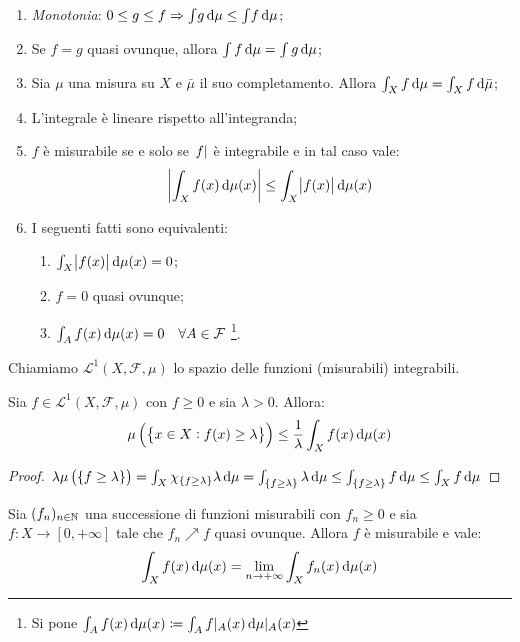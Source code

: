 \begin{enumerate}
    \item \emph{Monotonia}: $ 0 \leq g \leq f \Rightarrow \int\! g\dif\mu \leq \int\! f\dif\mu $;
    \item \label{it:quasi_ovunque}Se $ f=g $ quasi ovunque, allora $ \int f\dif\mu = \int g\dif\mu $;
    \item Sia $ \mu $ una misura su $ X $ e $ \bar{\mu} $ il suo completamento. Allora $ \int_X f\dif\mu = \int_X f\dif\bar{\mu} $;
    \item L'integrale è lineare rispetto all'integranda;
    \item $ f $ è misurabile se e solo se $ \abs{f} $ è integrabile e in tal caso vale:
    \[ \abs{ \int_X f(x)\dif\mu(x)} \leq \int_X \abs{f(x)}\dif\mu(x) \]
    \item I seguenti fatti sono equivalenti:
    \begin{enumerate}[label=(\roman*)]
        \item $ \int_X \abs{f(x)}\dif\mu(x) = 0$;
        \item $ f = 0 $ quasi ovunque;
        \item $ \int_A f(x)\dif\mu(x) = 0 \quad \forall A\in\mathcal{F} $ \footnote{Si pone $ \int_A f(x)\dif\mu(x) \coloneqq \int_A f\rvert_A(x) \dif\mu\rvert_A(x) $}.
    \end{enumerate}
\end{enumerate}
\begin{definition}
    Chiamiamo $ \mathscr{L}^1(X,\mathcal{F},\mu) $ lo spazio delle funzioni (misurabili) integrabili.
\end{definition}
\begin{exercise}
    Sia $ f\in\mathscr{L}^1(X,\mathcal{F},\mu) $ con $ f\geq 0 $ e sia $ \lambda > 0 $. Allora:
    \[ \mu\left( \left\{ x\in X : f(x) \ge \lambda \right\}  \right) \leq \frac{1}{\lambda}\int_X f(x)\dif\mu(x) \]
\end{exercise}
\begin{proof}
    $ \lambda\mu\left( \{ f \geq \lambda \} \right) = \int_X \chi_{ \{f\geq\lambda \} } \lambda \dif\mu = \int_{ \{ f \geq \lambda \} } \lambda \dif\mu \leq \int_{ \{ f \geq \lambda \} } f\dif\mu \leq \int_X f\dif\mu $
\end{proof}
\begin{thm}
    Sia $ (f_n)_{n\in\mathbb{N}} $ una successione di funzioni misurabili con $ f_n \geq 0 $ e sia $ f\colon X\to[0,+\infty] $ tale che $ f_n\nearrow f $ quasi ovunque. Allora $ f $ è misurabile e vale:
    \[ \int_X f(x)\dif\mu(x) = \lim_{n\to+\infty} \int_X f_n(x)\dif\mu(x) \]
\end{thm}
